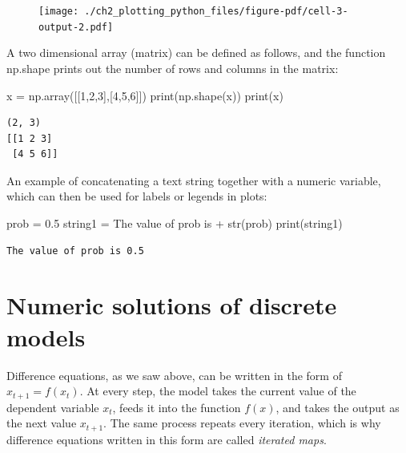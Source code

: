 \documentclass[
  letterpaper,
  DIV=11,
  numbers=noendperiod]{scrreprt}
\newenvironment{Shaded}{\begin{snugshade}}{\end{snugshade}}
\newcommand{\BuiltInTok}[1]{\textcolor[rgb]{0.00,0.23,0.31}{#1}}
\newcommand{\DecValTok}[1]{\textcolor[rgb]{0.68,0.00,0.00}{#1}}
\newcommand{\FloatTok}[1]{\textcolor[rgb]{0.68,0.00,0.00}{#1}}
\newcommand{\NormalTok}[1]{\textcolor[rgb]{0.00,0.23,0.31}{#1}}
\newcommand{\OperatorTok}[1]{\textcolor[rgb]{0.37,0.37,0.37}{#1}}
\newcommand{\StringTok}[1]{\textcolor[rgb]{0.13,0.47,0.30}{#1}}
\begin{document}
\begin{figure}[H]

{\centering \texttt{[image: ./ch2\_plotting\_python\_files/figure-pdf/cell-3-output-2.pdf]}

}

\end{figure}

A two dimensional array (matrix) can be defined as follows, and the
function np.shape prints out the number of rows and columns in the
matrix:

\begin{Shaded}
\begin{Highlighting}[]
\NormalTok{x }\OperatorTok{=}\NormalTok{ np.array([[}\DecValTok{1}\NormalTok{,}\DecValTok{2}\NormalTok{,}\DecValTok{3}\NormalTok{],[}\DecValTok{4}\NormalTok{,}\DecValTok{5}\NormalTok{,}\DecValTok{6}\NormalTok{]])}
\BuiltInTok{print}\NormalTok{(np.shape(x))}
\BuiltInTok{print}\NormalTok{(x)}
\end{Highlighting}
\end{Shaded}

\begin{verbatim}
(2, 3)
[[1 2 3]
 [4 5 6]]
\end{verbatim}

An example of concatenating a text string together with a numeric
variable, which can then be used for labels or legends in plots:

\begin{Shaded}
\begin{Highlighting}[]
\NormalTok{prob }\OperatorTok{=} \FloatTok{0.5}
\NormalTok{string1 }\OperatorTok{=} \StringTok{\textquotesingle{}The value of prob is \textquotesingle{}} \OperatorTok{+} \BuiltInTok{str}\NormalTok{(prob)}
\BuiltInTok{print}\NormalTok{(string1)}
\end{Highlighting}
\end{Shaded}

\begin{verbatim}
The value of prob is 0.5
\end{verbatim}

\hypertarget{numeric-solutions-of-discrete-models}{%
\section{Numeric solutions of discrete
models}\label{numeric-solutions-of-discrete-models}}

Difference equations, as we saw above, can be written in the form of
\(x_{t+1} = f(x_t)\). At every step, the model takes the current value
of the dependent variable \(x_t\), feeds it into the function \(f(x)\),
and takes the output as the next value \(x_{t+1}\). The same process
repeats every iteration, which is why difference equations written in
this form are called \emph{iterated maps}.
\end{document}
